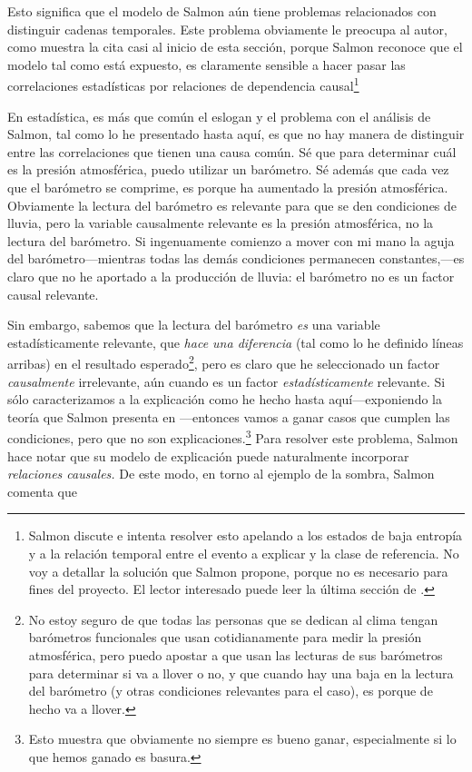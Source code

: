 Esto significa que el modelo de Salmon aún tiene problemas
relacionados con distinguir cadenas temporales. Este
problema obviamente le preocupa al autor, como muestra la
cita casi al inicio de esta sección, porque Salmon reconoce
que el modelo tal como está expuesto, es claramente sensible
a hacer pasar las correlaciones estadísticas por relaciones
de dependencia causal\footnote{
	Salmon discute e intenta resolver esto apelando
	a los estados de baja entropía y a la relación temporal
	entre el evento a explicar y la clase de referencia. No
	voy a detallar la solución que Salmon propone,	porque no
	es necesario para fines del proyecto. El lector
	interesado puede leer la última sección de
	\parencite{Salmon1970}. 
}

En estadística, es más que común el eslogan
 y el problema con
el análisis de Salmon, tal como lo he presentado hasta
aquí, es que no hay manera de distinguir entre las
correlaciones que tienen una causa común. Sé que para
determinar cuál es la presión atmosférica, puedo utilizar
un barómetro. Sé además que cada vez que el barómetro se
comprime, es porque ha aumentado la presión atmosférica.
Obviamente la lectura del barómetro es relevante para que
se den condiciones de lluvia, pero la variable
causalmente relevante es la presión atmosférica, no la
lectura del barómetro. Si ingenuamente comienzo a mover
con mi mano la aguja del barómetro---mientras todas las
demás condiciones permanecen constantes,---es claro que
no he aportado a la producción de lluvia: el barómetro no
es un factor causal relevante.

Sin embargo, sabemos que la lectura del barómetro
\emph{es} una variable estadísticamente relevante, que
\emph{hace una diferencia} (tal como lo he definido
líneas arribas) en el resultado esperado\footnote{
	No estoy seguro de que todas las personas que se
	dedican al clima tengan barómetros funcionales
	que usan cotidianamente para medir la presión
	atmosférica, pero puedo	apostar a que usan las
	lecturas de sus barómetros para determinar si
	va a llover o no, y que cuando hay una baja en la
	lectura del barómetro (y otras condiciones
	relevantes para el caso), es porque de	hecho va
	a llover. 
},
pero es claro que he seleccionado un
factor \emph{causalmente} irrelevante, aún cuando
es un factor \emph{estadísticamente} relevante.
Si sólo caracterizamos a la explicación como he
hecho hasta aquí---exponiendo la teoría que
Salmon presenta en \citeyear{Salmon1970}---entonces
vamos a ganar casos que cumplen las condiciones, pero que no
son explicaciones.\footnote{
	Esto muestra que obviamente no siempre es bueno ganar,
	especialmente si lo que hemos ganado es basura.
} 
Para resolver este problema, Salmon hace notar que su modelo
de explicación puede naturalmente incorporar
\emph{relaciones causales.} De este modo, en torno al
ejemplo de la sombra, Salmon comenta que

